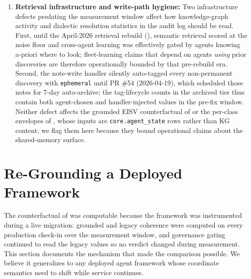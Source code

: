 \documentclass[11pt,twocolumn]{article}
\begin{document}
\begin{enumerate}
  adoption of UUID-direct dispatch, and receipt-based onboarding
  authentication. Class assignment is tag-based on the identity record
  (), so an identity whose tags were
  inherited from a cached binding or from an archived predecessor
  may appear in a class whose envelope does not match its actual
  operational regime. We expect this to affect a bounded fraction of
  rows rather than the aggregate direction of the per-class envelopes,
  but we have not filtered the counterfactual to post-fix identities;
  a re-measurement on identity-clean data, once sufficient post-fix
  history has accumulated, is deferred to subsequent work.
\item \textbf{Retrieval infrastructure and write-path hygiene:}
  Two infrastructure defects predating the measurement window affect
  how knowledge-graph activity and dialectic resolution statistics in
  the audit log should be read. First, until the
  April-2026 retrieval rebuild (),
  semantic retrieval scored at the noise floor and cross-agent
  learning was effectively gated by agents knowing a-priori where
  to look; fleet-learning claims that depend on agents
  \emph{using} prior discoveries are therefore operationally bounded
  by that pre-rebuild era. Second, the note-write handler
  silently auto-tagged every non-permanent discovery with
  \texttt{ephemeral} until PR \#54 (2026-04-19), which scheduled
  those notes for 7-day auto-archive; the tag-lifecycle counts in
  the archived tier thus contain both agent-chosen and
  handler-injected values in the pre-fix window. Neither defect
  affects the grounded EISV counterfactual of
   or the per-class envelopes of
  , whose inputs are
  \texttt{core.agent\_state} rows rather than KG content; we flag
  them here because they bound operational claims
  about the shared-memory surface.
\end{enumerate}


\section{Re-Grounding a Deployed Framework}
\label{sec:migration}

The counterfactual of  was
computable because the framework was instrumented during a live
migration: grounded and legacy coherence were computed on every
production check-in over the measurement window, and governance
gating continued to read the legacy values so no verdict changed
during measurement. This section documents the mechanism that
made the comparison possible. We believe it generalizes to any
deployed agent framework whose coordinate semantics need to shift
while service continues.
\end{document}
